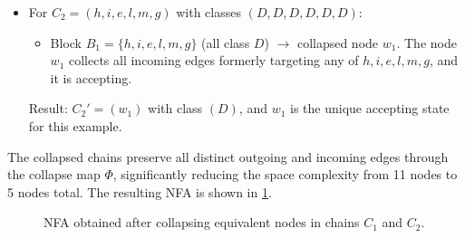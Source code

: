 \begin{example}
\begin{itemize}
        \item For $C_2 = (h,i,e,l,m,g)$ with classes $(D,D,D,D,D,D)$:
        \begin{itemize}
            \item Block $B_1 = \{h,i,e,l,m,g\}$ (all class $D$) $\rightarrow$ collapsed node $w_1$. The node $w_1$ collects all incoming edges formerly targeting any of $h,i,e,l,m,g$, and it is accepting.
        \end{itemize}
        Result: $C_2' = (w_1)$ with class $(D)$, and $w_1$ is the unique accepting state for this example.
    \end{itemize}
    
    The collapsed chains preserve all distinct outgoing and incoming edges through the collapse map $\Phi$, significantly reducing the space complexity from 11 nodes to 5 nodes total. The resulting NFA is shown in \cref{fig:minimized_chains}.

    \begin{figure}[H]
        \centering
        \caption{NFA obtained after collapsing equivalent nodes in chains $C_1$ and $C_2$.}
        \label{fig:minimized_chains}
    \end{figure} 
\end{example}

